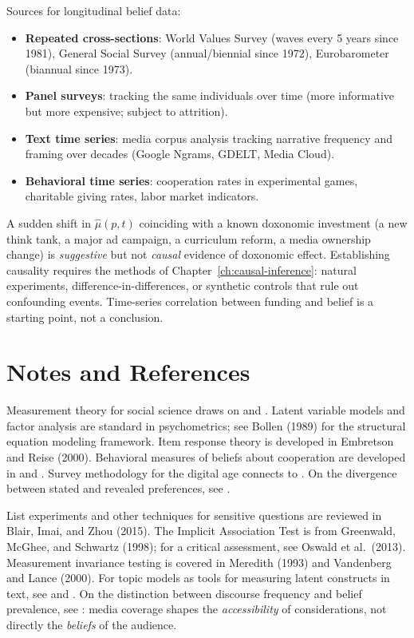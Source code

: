 Sources for longitudinal belief data:
\begin{itemize}[nosep]
  \item \textbf{Repeated cross-sections}: World Values Survey (waves every 5 years since 1981), General Social Survey (annual/biennial since 1972), Eurobarometer (biannual since 1973).
  \item \textbf{Panel surveys}: tracking the same individuals over time (more informative but more expensive; subject to attrition).
  \item \textbf{Text time series}: media corpus analysis tracking narrative frequency and framing over decades (Google Ngrams, GDELT, Media Cloud).
  \item \textbf{Behavioral time series}: cooperation rates in experimental games, charitable giving rates, labor market indicators.
\end{itemize}

\begin{remark}
\label{rem:event-identification}
A sudden shift in $\hat{\mu}(p, t)$ coinciding with a known doxonomic investment (a new think tank, a major ad campaign, a curriculum reform, a media ownership change) is \emph{suggestive} but not \emph{causal} evidence of doxonomic effect.
Establishing causality requires the methods of Chapter~\ref{ch:causal-inference}: natural experiments, difference-in-differences, or synthetic controls that rule out confounding events.
Time-series correlation between funding and belief is a starting point, not a conclusion.
\end{remark}


\section{Notes and References}
\label{sec:ch13-notes}

Measurement theory for social science draws on \textcite{king1994} and \textcite{gelman2020}.
Latent variable models and factor analysis are standard in psychometrics; see Bollen (1989) for the structural equation modeling framework.
Item response theory is developed in Embretson and Reise (2000).
Behavioral measures of beliefs about cooperation are developed in \textcite{fischbacher2001} and \textcite{henrich2001}.
Survey methodology for the digital age connects to \textcite{salganik2018}.
On the divergence between stated and revealed preferences, see \textcite{kahneman2011}.

List experiments and other techniques for sensitive questions are reviewed in Blair, Imai, and Zhou (2015).
The Implicit Association Test is from Greenwald, McGhee, and Schwartz (1998); for a critical assessment, see Oswald et al.\ (2013).
Measurement invariance testing is covered in Meredith (1993) and Vandenberg and Lance (2000).
For topic models as tools for measuring latent constructs in text, see \textcite{blei2003} and \textcite{grimmer2013}.
On the distinction between discourse frequency and belief prevalence, see \textcite{zaller1992}: media coverage shapes the \emph{accessibility} of considerations, not directly the \emph{beliefs} of the audience.


